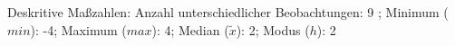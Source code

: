 				\label{tableValues:cski02a}
				\vspace*{-\baselineskip}
                    \begin{noten}
                	    \note{} Deskritive Maßzahlen:
                	    Anzahl unterschiedlicher Beobachtungen: 9%
                	    ; 
                	      Minimum ($min$): -4; 
                	      Maximum ($max$): 4; 
                	      Median ($\tilde{x}$): 2; 
                	      Modus ($h$): 2
                     \end{noten}


